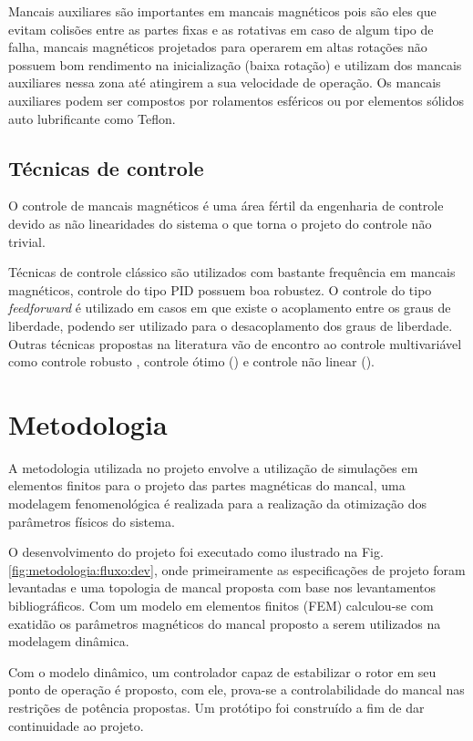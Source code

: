  Mancais auxiliares são importantes em mancais magnéticos pois são eles que evitam colisões entre as partes fixas e as rotativas em caso de algum tipo de falha, mancais magnéticos projetados para operarem em altas rotações não possuem bom rendimento na inicialização  (baixa rotação) e utilizam dos mancais auxiliares nessa zona até atingirem a sua velocidade de operação. Os mancais auxiliares podem ser compostos por rolamentos esféricos \citep{Sun2004a} ou por elementos sólidos auto lubrificante como Teflon.
 
\subsection{Técnicas de controle}

O controle de mancais magnéticos é uma área fértil da engenharia de controle devido as não linearidades do sistema o que torna o projeto do controle não trivial.  

Técnicas de controle clássico são utilizados com bastante frequência em mancais magnéticos, controle do tipo PID  \citep{Tezuka2013} possuem boa robustez. O controle  do tipo \textit{feedforward} é utilizado em casos em que existe o acoplamento entre os graus de liberdade, podendo ser utilizado para o desacoplamento dos graus de liberdade. Outras técnicas propostas na literatura vão de encontro ao controle multivariável como controle robusto \citep{Jimenez-Lizafrraga2007}, controle ótimo (\citep{Schuhmann2012}) e controle não linear (\citep{Rundell1996}).


\section{Metodologia}

A metodologia utilizada no projeto envolve a utilização de simulações em elementos finitos para o projeto das partes magnéticas do mancal, uma modelagem fenomenológica é realizada para a realização da otimização dos parâmetros físicos do sistema. 

O desenvolvimento do projeto foi executado como ilustrado na Fig. \ref{fig:metodologia:fluxo:dev}, onde primeiramente as especificações de projeto foram levantadas e uma topologia de mancal proposta com base nos levantamentos bibliográficos. Com um modelo em elementos finitos (FEM) calculou-se com exatidão os parâmetros magnéticos do mancal proposto a serem utilizados na modelagem dinâmica.

Com o modelo dinâmico, um controlador capaz de estabilizar o rotor em seu ponto de operação é proposto, com ele, prova-se a controlabilidade do mancal nas restrições de potência propostas. Um protótipo foi construído a fim de dar continuidade ao projeto.

